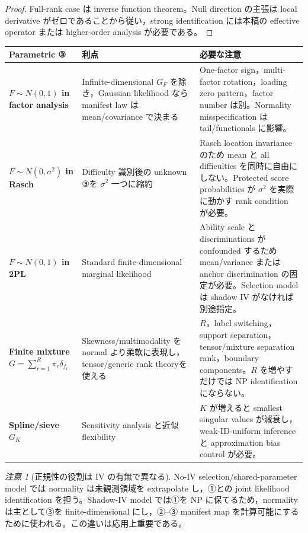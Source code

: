 \documentclass[11pt,a4paper]{ltjsarticle}
\theoremstyle{remark}
\newtheorem{remark}{注意}[section]
\begin{document}
\begin{proof}
Full-rank case は inverse function theorem。Null direction の主張は local derivative がゼロであることから従い，strong identification には本稿の effective operator または higher-order analysis が必要である。
\end{proof}

\begin{center}
\footnotesize
\begin{tabularx}{0.99\textwidth}{>{\bfseries}p{35mm}p{41mm}X}
\toprule
Parametric ③ & 利点 & 必要な注意\\
\midrule
$F\sim N(0,1)$ in factor analysis
& Infinite-dimensional $G_F$ を除き，Gaussian likelihood なら manifest law は mean/covariance で決まる
& One-factor sign，multi-factor rotation，loading zero pattern，factor number は別。Normality misspecification は tail/functionals に影響。\\
\addlinespace
$F\sim N(0,\sigma^2)$ in Rasch
& Difficulty 識別後の unknown ③を $\sigma^2$ 一つに縮約
& Rasch location invariance のため mean と all difficulties を同時に自由にしない。Protected score probabilities が $\sigma^2$ を実際に動かす rank condition が必要。\\
\addlinespace
$F\sim N(0,1)$ in 2PL
& Standard finite-dimensional marginal likelihood
& Ability scale と discriminations が confounded するため mean/variance または anchor discrimination の固定が必要。Selection model は shadow IV がなければ別途指定。\\
\addlinespace
Finite mixture $G=\sum_{r=1}^R\pi_r\delta_{f_r}$
& Skewness/multimodality を normal より柔軟に表現し，tensor/generic rank theoryを使える
& $R$，label switching，support separation，tensor/mixture separation rank，boundary components。$R$ を増やすだけでは NP identification にならない。\\
\addlinespace
Spline/sieve $G_K$
& Sensitivity analysis と近似 flexibility
& $K$ が増えると smallest singular values が減衰し，weak-ID-uniform inference と approximation bias control が必要。\\
\bottomrule
\end{tabularx}
\end{center}

\begin{remark}[正規性の役割は IV の有無で異なる]
No-IV selection/shared-parameter model では normality は未観測領域を extrapolate し，①との joint likelihood identification を担う。Shadow-IV model では①を NP に保てるため，normality は主として③を finite-dimensional にし，②--③ manifest map を計算可能にするために使われる。この違いは応用上重要である。
\end{remark}
\end{document}
